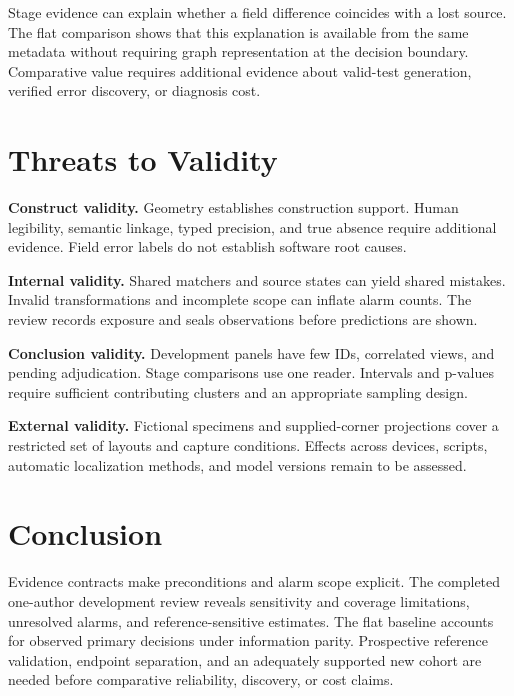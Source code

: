 \documentclass[sigconf,review,anonymous]{acmart}
\begin{document}
Stage evidence can explain whether a field difference coincides with a lost source. The flat comparison shows that this explanation is available from the same metadata without requiring graph representation at the decision boundary. Comparative value requires additional evidence about valid-test generation, verified error discovery, or diagnosis cost.

\section{Threats to Validity}
\textbf{Construct validity.} Geometry establishes construction support. Human legibility, semantic linkage, typed precision, and true absence require additional evidence. Field error labels do not establish software root causes.

\textbf{Internal validity.} Shared matchers and source states can yield shared mistakes. Invalid transformations and incomplete scope can inflate alarm counts. The review records exposure and seals observations before predictions are shown.

\textbf{Conclusion validity.} Development panels have few IDs, correlated views, and pending adjudication. Stage comparisons use one reader. Intervals and p-values require sufficient contributing clusters and an appropriate sampling design.

\textbf{External validity.} Fictional specimens and supplied-corner projections cover a restricted set of layouts and capture conditions. Effects across devices, scripts, automatic localization methods, and model versions remain to be assessed.

\section{Conclusion}
Evidence contracts make preconditions and alarm scope explicit. The completed one-author development review reveals sensitivity and coverage limitations, unresolved alarms, and reference-sensitive estimates. The flat baseline accounts for observed primary decisions under information parity. Prospective reference validation, endpoint separation, and an adequately supported new cohort are needed before comparative reliability, discovery, or cost claims.



\end{document}
